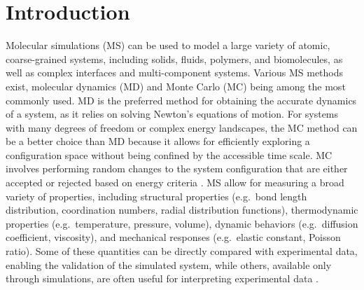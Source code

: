 \documentclass[9pt,tutorial]{livecoms}
\begin{document}
\section{Introduction}





Molecular simulations (MS) can be used to model a large variety of
atomic, coarse-grained systems, including solids, fluids, polymers, and
biomolecules, as well as complex interfaces and multi-component systems.
Various MS methods exist, molecular dynamics (MD) and Monte Carlo (MC)
being among the most commonly used.  MD is the preferred method for
obtaining the accurate dynamics of a system, as it relies on solving
Newton's equations of motion.  For systems with many degrees of freedom
or complex energy landscapes, the MC method can be a better choice than
MD because it allows for efficiently exploring a configuration space
without being confined by the accessible time scale.  MC involves
performing random changes to the system configuration that are either
accepted or rejected based on energy criteria
\cite{frenkel2023understanding, allen2017computer}.  MS allow for
measuring a broad variety of properties, including structural properties
(e.g.~bond length distribution, coordination numbers, radial
distribution functions), thermodynamic properties (e.g.~temperature,
pressure, volume), dynamic behaviors (e.g.~diffusion coefficient,
viscosity), and mechanical responses (e.g.~elastic constant, Poisson
ratio).  Some of these quantities can be directly compared with
experimental data, enabling the validation of the simulated system,
while others, available only through simulations, are often useful for
interpreting experimental data \cite{van2008molecular}.
\end{document}

